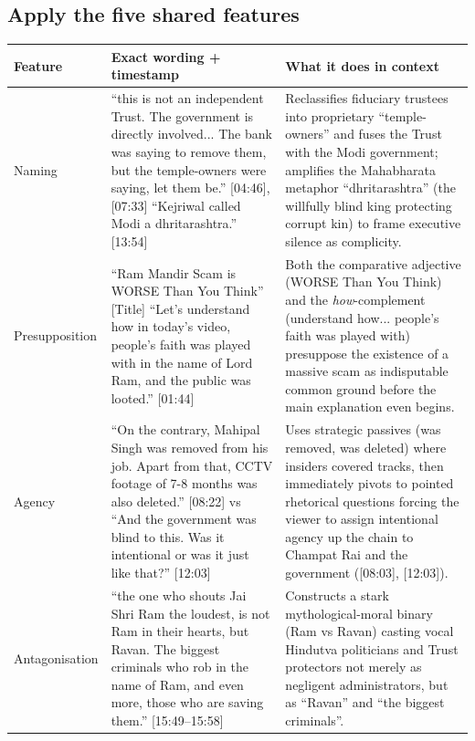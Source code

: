 \documentclass[10pt,a4paper]{article}
\begin{document}
\subsection*{Apply the five shared features}
\par\vspace{4pt}
{\small
\begin{longtable}{@{}>{\raggedright\arraybackslash}p{} >{\raggedright\arraybackslash}p{} >{\raggedright\arraybackslash}p{}@{}}
\toprule
\textbf{Feature} & \textbf{Exact wording + timestamp} & \textbf{What it does in context} \\
\midrule
\endhead
Naming & ``this is not an independent Trust. The government is directly involved... The bank was saying to remove them, but the temple-owners were saying, let them be.'' [04:46], [07:33] \newline  ``Kejriwal called Modi a dhritarashtra.'' [13:54] & Reclassifies fiduciary trustees into proprietary ``temple-owners'' and fuses the Trust with the Modi government; amplifies the Mahabharata metaphor ``dhritarashtra'' (the willfully blind king protecting corrupt kin) to frame executive silence as complicity. \\
\addlinespace[6pt]
Presupposition & ``Ram Mandir Scam is WORSE Than You Think'' [Title] \newline  ``Let's understand how in today's video, people's faith was played with in the name of Lord Ram, and the public was looted.'' [01:44] & Both the comparative adjective (WORSE Than You Think) and the \emph{how}-complement (understand how... people's faith was played with) presuppose the existence of a massive scam as indisputable common ground before the main explanation even begins. \\
\addlinespace[6pt]
Agency & ``On the contrary, Mahipal Singh was removed from his job. Apart from that, CCTV footage of 7-8 months was also deleted.'' [08:22] vs ``And the government was blind to this. Was it intentional or was it just like that?'' [12:03] & Uses strategic passives (was removed, was deleted) where insiders covered tracks, then immediately pivots to pointed rhetorical questions forcing the viewer to assign intentional agency up the chain to Champat Rai and the government ([08:03], [12:03]). \\
\addlinespace[6pt]
Antagonisation & ``the one who shouts Jai Shri Ram the loudest, is not Ram in their hearts, but Ravan. The biggest criminals who rob in the name of Ram, and even more, those who are saving them.'' [15:49--15:58] & Constructs a stark mythological-moral binary (Ram vs Ravan) casting vocal Hindutva politicians and Trust protectors not merely as negligent administrators, but as ``Ravan'' and ``the biggest criminals''. \\

\end{longtable}}
\end{document}
